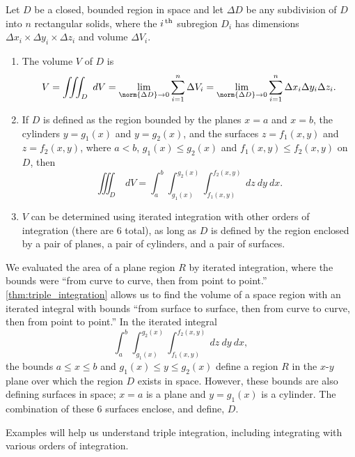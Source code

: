{
\begin{theorem}\label{thm:triple_integration}
Let $D$ be a closed, bounded region in space and let $\Delta D$ be any subdivision of $D$ into $n$ rectangular solids, where the  $i^\text{\,th}$ subregion $D_i$ has dimensions $\Delta x_i\times\Delta y_i\times\Delta z_i$ and volume $\Delta V_i$.
\begin{enumerate}
	\item	The volume $V$ of $D$ is
	\[V = \iiint_D\ dV = \lim_{\norm{\Delta D}\to0} \sum_{i=1}^n \Delta V_i = \lim_{\norm{\Delta D}\to0} \sum_{i=1}^n \Delta x_i\Delta y_i\Delta z_i.\]

	\item	If $D$ is defined as the region bounded by the planes $x=a$ and $x=b$, the cylinders $y=g_1(x)$ and $y=g_2(x)$, and the surfaces $z=f_1(x,y)$ and $z=f_2(x,y)$, where $a<b$, $g_1(x)\leq g_2(x)$ and $f_1(x,y)\leq f_2(x,y)$ on $D$, then
	\[\iiint_D \ dV = \int_a^b\int_{g_1(x)}^{g_2(x)}\int_{f_1(x,y)}^{f_2(x,y)} \ dz\ dy\ dx.\]

	\item	$V$ can be determined using iterated integration with other orders of integration (there are 6 total), as long as $D$ is defined by the region enclosed by a pair of planes, a pair of cylinders, and a pair of surfaces.
\end{enumerate}
\end{theorem}
}

We evaluated the area of a plane region $R$ by iterated integration, where the bounds were ``from curve to curve, then from point to point.'' \autoref{thm:triple_integration} allows us to find the volume of a space region with an iterated integral with bounds ``from surface to surface, then from curve to curve, then from point to point.'' In the iterated integral 
\[\int_a^b\int_{g_1(x)}^{g_2(x)}\int_{f_1(x,y)}^{f_2(x,y)} \ dz\ dy\ dx,\]
the bounds $a\leq x\leq b$ and $g_1(x)\leq y\leq g_2(x)$ define a region $R$ in the $x$-$y$ plane over which the region $D$ exists in space. However, these bounds are also defining surfaces in space; $x=a$ is a plane and $y=g_1(x)$ is a cylinder. The combination of these 6 surfaces enclose, and define, $D$.


Examples will help us understand triple integration, including integrating with various orders of integration.

